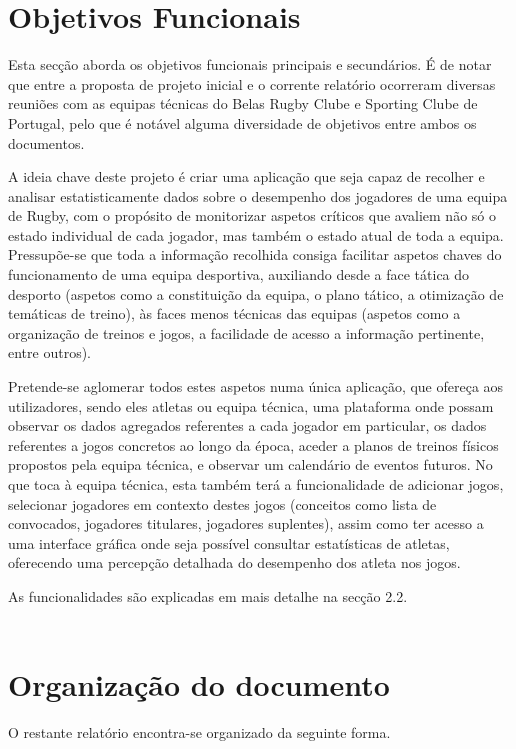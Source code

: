 %
%
\section{Objetivos Funcionais}\label{sec12} 

Esta secção aborda os objetivos funcionais principais e secundários. É de notar que entre a proposta de projeto inicial e o corrente relatório ocorreram diversas reuniões com as equipas técnicas do Belas Rugby Clube e Sporting Clube de Portugal, pelo que é notável alguma diversidade de objetivos entre ambos os documentos.

A ideia chave deste projeto é criar uma aplicação que seja capaz de recolher e analisar estatisticamente dados sobre o desempenho dos jogadores de uma equipa de Rugby, com o propósito de monitorizar aspetos críticos que avaliem não só o estado individual de cada jogador, mas também o estado atual de toda a equipa. Pressupõe-se que toda a informação recolhida consiga facilitar aspetos chaves do funcionamento de uma equipa desportiva, auxiliando desde a face tática do desporto (aspetos como a constituição da equipa, o plano tático, a otimização de temáticas de treino), às faces menos técnicas das equipas (aspetos como a organização de treinos e jogos, a facilidade de acesso a informação pertinente, entre outros).

Pretende-se aglomerar todos estes aspetos numa única aplicação, que ofereça aos utilizadores, sendo eles atletas ou equipa técnica, uma plataforma onde possam observar os dados agregados referentes a cada jogador em particular, os dados referentes a jogos concretos ao longo da época, aceder a planos de treinos físicos propostos pela equipa técnica, e observar um calendário de eventos futuros. No que toca à equipa técnica, esta também terá a funcionalidade de adicionar jogos, selecionar jogadores em contexto destes jogos (conceitos como lista de convocados, jogadores titulares, jogadores suplentes), assim como ter acesso a uma interface gráfica onde seja possível consultar estatísticas de atletas, oferecendo uma percepção detalhada do desempenho dos atleta nos jogos. 

As funcionalidades são explicadas em mais detalhe na secção 2.2.\\
\\

\section{Organização do documento} \label{sec13}
O restante relatório encontra-se organizado da seguinte forma.\\

